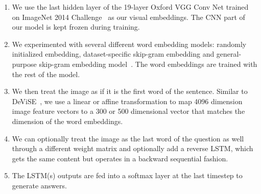 \documentclass{article} \usepackage{nips15submit_e,times}
\renewcommand{\#}[1]{\textbf{#1}}
\begin{document}
\begin{enumerate}
\item We use the last hidden layer of the 19-layer Oxford VGG Conv Net
\cite{simonyan14} trained on ImageNet 2014 Challenge~\cite{ilsvrc14} as our
visual embeddings. The CNN part of our model is kept frozen during training.

\item We experimented with several different word embedding models: randomly
initialized embedding, dataset-specific skip-gram embedding and general-purpose
skip-gram embedding model~\cite{mikolov13}. The word embeddings are trained
with the rest of the model.

\item We then treat the image as if it is the first word of the sentence.
Similar to DeViSE~\cite{frome13}, we use a linear or affine transformation to
map 4096 dimension image feature vectors to a 300 or 500 dimensional vector
that matches the dimension of the word embeddings.

\item We can optionally treat the image as the last word of the question as
well through a different weight matrix and optionally add a reverse LSTM, which
gets the same content but operates in a backward sequential fashion.

\item The LSTM(s) outputs are fed into a softmax layer at the last timestep to
generate answers.
\end{enumerate}
\end{document}
